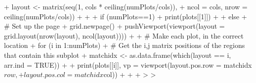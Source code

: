 \documentclass[a4paper]{article}
\begin{document}
\begin{Schunk}
\begin{Sinput}
{{+         layout <- matrix(seq(1, cols * ceiling(numPlots/cols)),
+                          ncol = cols, nrow = ceiling(numPlots/cols))
+     }
+ 
+     if (numPlots==1) {
+         print(plots[[1]])
+ 
+     } else {
+         # Set up the page
+         grid.newpage()
+         pushViewport(viewport(layout = grid.layout(nrow(layout), ncol(layout))))
+ 
+         # Make each plot, in the correct location
+         for (i in 1:numPlots) {
+         # Get the i,j matrix positions of the regions that contain this subplot
+             matchidx <- as.data.frame(which(layout == i, arr.ind = TRUE))
+ 
+             print(plots[[i]], vp = viewport(layout.pos.row = matchidx$row,
+                                             layout.pos.col = matchidx$col))
+         }
+     }
+ }
> 
> 
\end{Sinput}
\end{Schunk}
\end{document}
